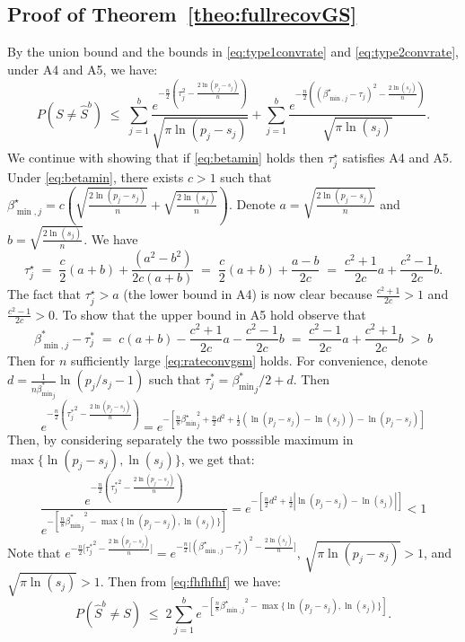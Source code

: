 \documentclass[aos]{imsart}
\theoremstyle{plain}
\begin{document}
\subsection{Proof of Theorem~\ref{theo:fullrecovGS}}
By the union bound and the bounds in \eqref{eq:type1convrate} and \eqref{eq:type2convrate}, under A4 and A5, we have:
\begin{equation}\label{eq:fhfhfhf}
P(S\neq \hat{S}^b) \; \leq\;\sum_{j=1}^b\frac{e^{-\tfrac{n}{2}\left(\tau_j^2-\tfrac{2\ln(p_j-s_j)}{n}\right)}}{\sqrt{\pi\ln(p_j-s_j)}}+\sum_{j=1}^b\frac{e^{-\tfrac{n}{2}\left((\beta^\star_{\min,j}-\tau_j)^2-\tfrac{2\ln(s_j)}{n}\right)}}{\sqrt{\pi\ln(s_j)}}.
\end{equation}
We continue with showing that if \eqref{eq:betamin} holds then $\tau^\star_j$ satisfies A4 and A5. Under \eqref{eq:betamin}, there exists $c>1$ such that $\beta^\star_{\min,j}=c(\sqrt{\tfrac{2\ln(p_j-s_j)}{n}} + \sqrt{\tfrac{2\ln(s_j)}{n}})$. Denote $a=\sqrt{\tfrac{2\ln(p_j-s_j)}{n}}$ and $b=\sqrt{\tfrac{2\ln(s_j)}{n}}$. We have
$$
\tau_j^\star\;=\;\frac{c}{2} (a+b)+\frac{(a^2-b^2)}{2c(a+b)}\;=\;\frac{c}{2} (a+b)+\frac{a-b}{2c}\;=\;\frac{c^2+1}{2c}a+\frac{c^2-1}{2c}b.
$$
The fact that $\tau^\star_j>a$ (the lower bound in A4) is now clear because $\tfrac{c^2+1}{2c}> 1$  and $\tfrac{c^2-1}{2c}> 0$. To show that the upper bound in A5 hold observe that
$$
\beta_{\min,j}^* - \tau^*_j \;=\; c(a+b)- \frac{c^2+1}{2c}a-\frac{c^2-1}{2c}b \;= \; \frac{c^2-1}{2c}a+\frac{c^2+1}{2c}b\;>\;  b 
$$
Then for $n$ sufficiently large \eqref{eq:rateconvgsm} holds. For convenience, denote $d = \frac{1}{n {\beta_{\min}^*}_j} \ln (p_j / s_j-1)$ such that $\tau^*_j= {\beta_{\min}^*}_j/2 + d$. Then
$$e^{-\frac{n}{2}\left({\tau^*_j}^2-\frac{2\ln(p_j-s_j)}{n}\right)}
=e^{-\left[\frac{n}{8}{\beta_{\min}^{\star}}_j^2+\frac{n}{2}d^2 + \frac{1}{2}\left(\ln (p_j- s_j)-\ln (s_j)\right) -\ln (p_j- s_j)\right]}$$
Then, by considering separately the two posssible maximum in $\max\{\ln(p_j-s_j),\ln(s_j)\}$, we get that:
$$\frac{e^{-\frac{n}{2}\left({\tau^*_j}^2-\frac{2\ln(p_j-s_j)}{n}\right)}}{e^{-[\frac{n}{8}{{\beta_{\min}^*}_j}^2-\max\{\ln(p_j-s_j),\ln(s_j)\}]}}= 
e^{-\left[\frac{n}{2}d^2 + \frac{1}{2}\left|\ln (p_j- s_j)-\ln (s_j)\right|\right]} <1$$
Note that $e^{-\tfrac{n}{2}\big[{\tau_j^*}^2-\tfrac{2\ln(p_j-s_j)}{n}\big]}=e^{-\tfrac{n}{2}\big[(\beta^\star_{\min,j}-{\tau_j^*})^2-\tfrac{2\ln(s_j)}{n}\big]}$, $\sqrt{\pi\ln(p_j-s_j)}>1$, and $\sqrt{\pi\ln(s_j)}>1$. Then from \eqref{eq:fhfhfhf} we have:
$$P(\hat{S}^{b} \neq S) \; \leq \; 2 \sum_{j=1}^be^{-[\frac{n}{8}{\beta^\star_{\min,j}}^2-\max\{\ln(p_j-s_j),\ln(s_j)\}]}.$$
\end{document}
